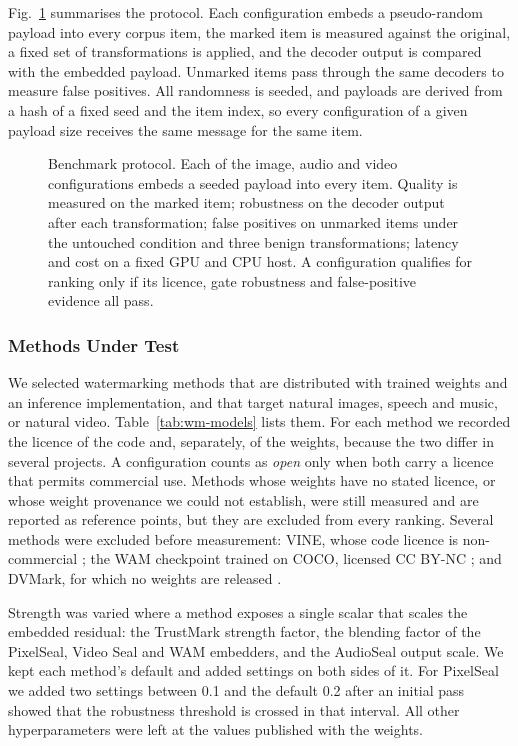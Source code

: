 Fig.~\ref{fig:wm-pipeline} summarises the protocol. Each configuration embeds a pseudo-random payload into every corpus item, the marked item is measured against the original, a fixed set of transformations is applied, and the decoder output is compared with the embedded payload. Unmarked items pass through the same decoders to measure false positives. All randomness is seeded, and payloads are derived from a hash of a fixed seed and the item index, so every configuration of a given payload size receives the same message for the same item.

\begin{figure}[!t]
\centering

\caption{Benchmark protocol. Each of the  image,  audio and  video configurations embeds a seeded payload into every item. Quality is measured on the marked item; robustness on the decoder output after each transformation; false positives on unmarked items under the untouched condition and three benign transformations; latency and cost on a fixed GPU and CPU host. A configuration qualifies for ranking only if its licence, gate robustness and false-positive evidence all pass.}
\label{fig:wm-pipeline}
\end{figure}

\subsubsection{Methods Under Test}
We selected watermarking methods that are distributed with trained weights and an inference implementation, and that target natural images, speech and music, or natural video. Table~\ref{tab:wm-models} lists them. For each method we recorded the licence of the code and, separately, of the weights, because the two differ in several projects. A configuration counts as \emph{open} only when both carry a licence that permits commercial use. Methods whose weights have no stated licence, or whose weight provenance we could not establish, were still measured and are reported as reference points, but they are excluded from every ranking. Several methods were excluded before measurement: VINE, whose code licence is non-commercial \cite{lu2025vine}; the WAM checkpoint trained on COCO, licensed CC BY-NC \cite{sander2025wam}; and DVMark, for which no weights are released \cite{luo2025dvmark}.

Strength was varied where a method exposes a single scalar that scales the embedded residual: the TrustMark strength factor, the blending factor of the PixelSeal, Video Seal and WAM embedders, and the AudioSeal output scale. We kept each method's default and added settings on both sides of it. For PixelSeal we added two settings between 0.1 and the default 0.2 after an initial pass showed that the robustness threshold is crossed in that interval. All other hyperparameters were left at the values published with the weights.

